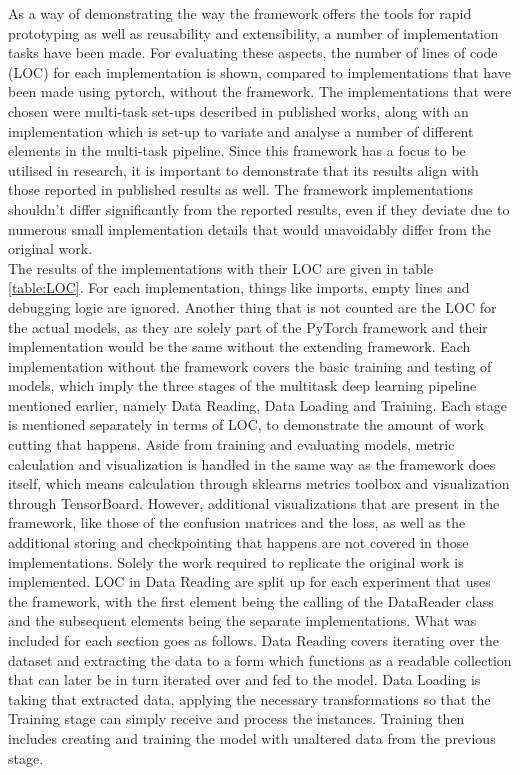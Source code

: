 As a way of demonstrating the way the framework offers the tools for rapid prototyping as well as reusability and extensibility, a number of implementation tasks have been made. For evaluating these aspects, the number of lines of code (LOC) for each implementation is shown, compared to implementations that have been made using pytorch, without the framework. The implementations that were chosen were multi-task set-ups described in published works, along with an implementation which is set-up to variate and analyse a number of different elements in the multi-task pipeline. Since this framework has a focus to be utilised in research, it is important to demonstrate that its results align with those reported in published results as well. The framework implementations shouldn't differ significantly from the reported results, even if they deviate due to numerous small implementation details that would unavoidably differ from the original work.\\

The results of the implementations with their LOC are given in table \ref{table:LOC}. For each implementation, things like imports, empty lines and debugging logic are ignored. Another thing that is not counted are the LOC for the actual models, as they are solely part of the PyTorch framework and their implementation would be the same without the extending framework. Each implementation without the framework covers the basic training and testing of models, which imply the three stages of the multitask deep learning pipeline mentioned earlier, namely Data Reading, Data Loading and Training. Each stage is mentioned separately in terms of LOC, to demonstrate the amount of work cutting that happens. Aside from training and evaluating models, metric calculation and visualization is handled in the same way as the framework does itself, which means calculation through sklearns metrics toolbox and visualization through TensorBoard. However, additional visualizations that are present in the framework, like those of the confusion matrices and the loss, as well as the additional storing and checkpointing that happens are not covered in those implementations. Solely the work required to replicate the original work is implemented. LOC in Data Reading are split up for each experiment that uses the framework, with the first element being the calling of the DataReader class and the subsequent elements being the separate implementations. What was included for each section goes as follows. Data Reading covers iterating over the dataset and extracting the data to a form which functions as a readable collection that can later be in turn iterated over and fed to the model. Data Loading is taking that extracted data, applying the necessary transformations so that the Training stage can simply receive and process the instances. Training then includes creating and training the model with unaltered data from the previous stage.\\

